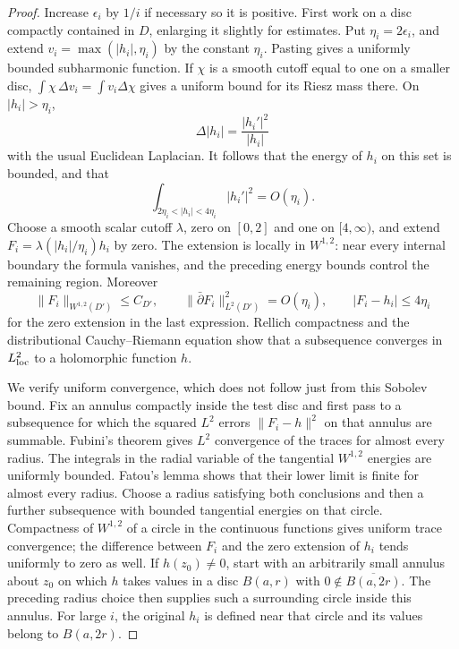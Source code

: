 \begin{proof}
Increase $\epsilon_i$ by $1/i$ if necessary so it is positive. First work on a disc compactly contained in $D$, enlarging it slightly for estimates. Put $\eta_i=2\epsilon_i$, and extend $v_i=\max(|h_i|,\eta_i)$ by the constant $\eta_i$. Pasting gives a uniformly bounded subharmonic function. If $\chi$ is a smooth cutoff equal to one on a smaller disc, $\int\chi\,\Delta v_i=\int v_i\Delta\chi$ gives a uniform bound for its Riesz mass there. On $|h_i|>\eta_i$,
\[
 \Delta|h_i|=\frac{|h_i'|^2}{|h_i|}
\]
with the usual Euclidean Laplacian. It follows that the energy of $h_i$ on this set is bounded, and that
\[
 \int_{2\eta_i<|h_i|<4\eta_i}|h_i'|^2=O(\eta_i).
\]
Choose a smooth scalar cutoff $\lambda$, zero on $[0,2]$ and one on $[4,\infty)$, and extend $F_i=\lambda(|h_i|/\eta_i)h_i$ by zero. The extension is locally in $W^{1,2}$: near every internal boundary the formula vanishes, and the preceding energy bounds control the remaining region. Moreover
\[
 \|F_i\|_{W^{1,2}(D')}\leq C_{D'},\qquad
 \|\bar\partial F_i\|_{L^2(D')}^2=O(\eta_i),\qquad
 |F_i-h_i|\leq4\eta_i
\]
for the zero extension in the last expression. Rellich compactness and the distributional Cauchy--Riemann equation show that a subsequence converges in $L^2_{\rm loc}$ to a holomorphic function $h$.

We verify uniform convergence, which does not follow just from this Sobolev bound. Fix an annulus compactly inside the test disc and first pass to a subsequence for which the squared $L^2$ errors $\|F_i-h\|^2$ on that annulus are summable. Fubini's theorem gives $L^2$ convergence of the traces for almost every radius. The integrals in the radial variable of the tangential $W^{1,2}$ energies are uniformly bounded. Fatou's lemma shows that their lower limit is finite for almost every radius. Choose a radius satisfying both conclusions and then a further subsequence with bounded tangential energies on that circle. Compactness of $W^{1,2}$ of a circle in the continuous functions gives uniform trace convergence; the difference between $F_i$ and the zero extension of $h_i$ tends uniformly to zero as well. If $h(z_0)\ne0$, start with an arbitrarily small annulus about $z_0$ on which $h$ takes values in a disc $B(a,r)$ with $0\notin\overline{B(a,2r)}$. The preceding radius choice then supplies such a surrounding circle inside this annulus. For large $i$, the original $h_i$ is defined near that circle and its values belong to $B(a,2r)$.


\end{proof}
